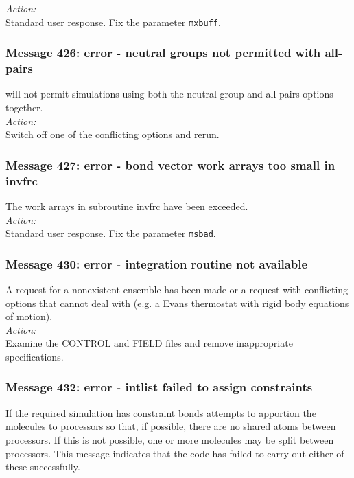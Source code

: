 \noindent
{\em Action:}\\ Standard user response. Fix the parameter {\tt mxbuff}.

\subsubsection*{Message 426: error - neutral groups not permitted with
all-pairs}

\D{} will not permit simulations using both the neutral group
and all pairs options together. \\

\noindent
{\em Action:} \\
Switch off one of the conflicting options and rerun.

\subsubsection*{Message 427: error - bond vector work arrays too small in invfrc}

The work arrays in subroutine {\sc invfrc} have been exceeded.\\

\noindent
{\em Action:} \\
Standard user response. Fix the parameter {\tt msbad}.

\subsubsection*{Message 430: error - integration routine not available}

A request for a nonexistent ensemble  has been made or a request with
conflicting options that \D{} cannot deal with (e.g. a Evans
thermostat  with
rigid body  equations of motion).\\

\noindent
{\em Action:}\\
Examine the CONTROL and FIELD files and remove inappropriate specifications. 

\subsubsection*{Message 432: error - intlist failed to assign
constraints }

If the required simulation has constraint bonds  \D{} attempts
to apportion the molecules to processors so that, if possible, there
are no shared atoms between processors. If this is not possible, one
or more molecules may be split between processors. This message
indicates that the code has failed to carry out either of these
successfully. \\

